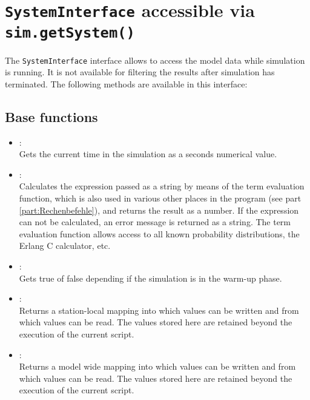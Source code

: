 \chapter{\texttt{SystemInterface} accessible via \texttt{sim.getSystem()}}

The \texttt{SystemInterface} interface allows to access the model data while simulation is running.
It is not available for filtering the results after simulation has terminated.
The following methods are available in this interface:

\section{Base functions}

\begin{itemize}

\item
{}:\\
Gets the current time in the simulation as a seconds numerical value.
  
\item
{}:\\
Calculates the expression passed as a string by means of the term evaluation function,
which is also used in various other places in the program (see part \ref{part:Rechenbefehle}), and returns the result as a  number.
If the expression can not be calculated, an error message is returned as a string.
The term evaluation function allows access to all known probability distributions,
the Erlang C calculator, etc.
  
\item
{}:\\
Gets true of false depending if the simulation is in the warm-up phase.

\item
{}:\\
Returns a station-local mapping into which values can be written and from which values can be read.
The values stored here are retained beyond the execution of the current script.  

\item
{}:\\
Returns a model wide mapping into which values can be written and from which values can be read.
The values stored here are retained beyond the execution of the current script.


\end{itemize}
